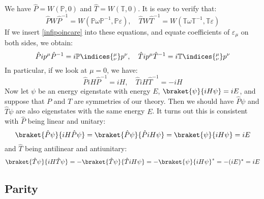 \documentclass{jknotes}
\begin{document}
We have \(\hat{P} = W(\mathbb{P},0)\) and \(\hat{T} = W(\mathbb{T},0)\). It is easy to verify that:
\begin{equation}
    \hat{P}W\hat{P}^{-1} = W(\mathbb{P}\omega\mathbb{P}^{-1},\mathbb{P}\varepsilon)
    ,\quad
    \hat{T}W\hat{T}^{-1} = W(\mathbb{T}\omega\mathbb{T}^{-1},\mathbb{T}\varepsilon)
\end{equation}
If we insert \eqref{infipoincare} into these equations, and equate coefficients of \(\varepsilon_\mu\) on both sides, we obtain:
\begin{equation}
    \hat{P}ip^\mu\hat{P}^{-1} = i\mathbb{P}\indices{_\nu^\mu}p^\nu
    ,\quad
    \hat{T}ip^\mu\hat{T}^{-1} = i\mathbb{T}\indices{_\nu^\mu}p^\nu
\end{equation}
In particular, if we look at \(\mu=0\), we have:
\begin{equation}
    \hat{P}iH\hat{P}^{-1} = iH
    ,\quad
    \hat{T}iH\hat{T}^{-1} = -iH
\end{equation}
Now let \(\psi\) be an energy eigenstate with energy \(E\), \(\braket{\psi}{iH\psi}=iE\), and suppose that \(P\) and \(T\) are symmetries of our theory. Then we should have \(\hat{P}\psi\) and \(\hat{T}\psi\) are also eigenstates with the same energy \(E\). It turns out this is consistent with \(\hat{P}\) being linear and unitary:
\begin{equation}
    \braket{\hat{P}\psi}{iH\hat{P}\psi} = \braket{\hat{P}\psi}{\hat{P}iH\psi} = \braket{\psi}{iH\psi} = iE
\end{equation}
and \(\hat{T}\) being antilinear and antiunitary:
\begin{equation}
    \braket{\hat{T}\psi}{iH\hat{T}\psi} = -\braket{\hat{T}\psi}{\hat{T}iH\psi} = -\braket{\psi}{iH\psi}^* = -(iE)^* = iE
\end{equation}

\subsection{Parity}
\end{document}
